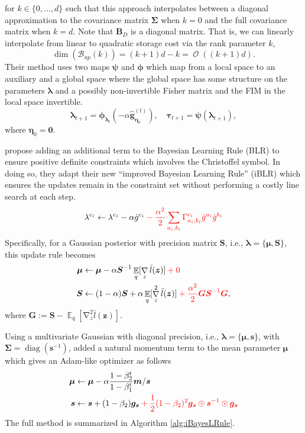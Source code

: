 \documentclass[a4paper, 11pt, oneside]{scrartcl}
\theoremstyle{break}
\DeclareMathOperator{\diag}{diag}
\DeclareMathOperator{\Expect}{\mathbb{E}}
\DeclareMathOperator{\grad}{\nabla}
\DeclareMathOperator{\BigO}{\mathcal{O}}
\newcommand{\matr}[1]{\boldsymbol{#1}}
\newcommand{\set}[1]{\mathcal{#1}}
\numberwithin{equation}{section}
\begin{document}
				for $k \in \{0, \dots, d\}$ such that this approach interpolates between a diagonal approximation to the covariance matrix $\matr{\Sigma}$ when $k = 0$ and the full covariance matrix when $k = d$.
				Note that $\matr{B}_D$ is a diagonal matrix.
				That is, we can linearly interpolate from linear to quadratic storage cost via the rank parameter $k$,
				\begin{equation*}
					\dim(\set{B}_{up}(k)) = (k + 1) d - k = \BigO ((k + 1) d).
				\end{equation*}
				Their method uses two maps $\matr{\psi}$ and $\matr{\phi}$ which map from a local space to an auxiliary and a global space where the global space has some structure on the parameters $\matr{\lambda}$ and a possibly non-invertible Fisher matrix and the FIM in the local space invertible. 
				$$\matr{\lambda}_{t+1} = \matr{\phi}_{\matr{\lambda}_t}(-\alpha \matr{\hat{g}}_{\matr{\eta}_0}^{(t)}), \quad \matr{\tau}_{t+1} = \matr{\psi} (\matr{\lambda}_{t+1}),$$
				where $\matr{\eta}_0 = \matr{0}$.

				\cite{LSK20} propose adding an additional term to the Bayesian Learning Rule (BLR) to ensure positive definite constraints which involves the Christoffel symbol. 
				In doing so, they adapt their new ``improved Bayesian Learning Rule'' (iBLR) which ensures the updates remain in the constraint set without performing a costly line search at each step. 
				\begin{align*}
					\lambda^{c_i} \leftarrow \lambda^{c_i} - \alpha \hat{g}^{c_i} \color{red} - \frac{\alpha^2}{2} \sum_{a_i, b_i} \Gamma_{a_i, b_i}^{c_i} \hat{g}^{a_i} \hat{g}^{b_i} \color{black}
				\end{align*}
				Specifically, for a Gaussian posterior with precision matrix $\matr{S}$, i.e., $\matr{\lambda} = \{\matr{\mu}, \matr{S}\}$, this update rule becomes
				\begin{align*}
					\matr{\mu} &\leftarrow \matr{\mu} - \alpha \matr{S}^{-1} \Expect_q[\grad_z \bar{l}(\matr{z})] \color{red} + 0 \color{black}\\
					\matr{S} &\leftarrow (1 - \alpha) \matr{S} + \alpha \Expect_q[\grad_z^2 \bar{l}(\matr{z})] \color{red} + \frac{\alpha^2}{2} \matr{G} \matr{S}^{-1} \matr{G} \color{black},
				\end{align*}
				where $\matr{G} := \matr{S} - \Expect_q[\grad_z^2 \bar{l}(\matr{z})]$.

				Using a multivariate Gaussian with diagonal precision, i.e., $\matr{\lambda} = \{\matr{\mu}, \matr{s}\}$, with $\matr{\Sigma} = \diag (\matr{s}^{-1})$, \cite{LSK20} added a natural momentum term to the mean parameter $\matr{\mu}$ which gives an Adam-like optimizer as follows
				\begin{align*}
					\matr{\mu} &\leftarrow \matr{\mu} - \alpha \frac{1 - \beta_2^t}{1 - \beta_1^t} \matr{m} / \matr{s} \\
					\matr{s} &\leftarrow \matr{s} + (1 - \beta_2) \matr{g_s} \color{red} + \frac{1}{2} (1 - \beta_2)^2 \matr{g_s} \odot \matr{s}^{-1} \odot \matr{g_s} \color{black}
				\end{align*}
				The full method is summarized in Algorithm \ref{alg:iBayesLRule}.
\end{document}
